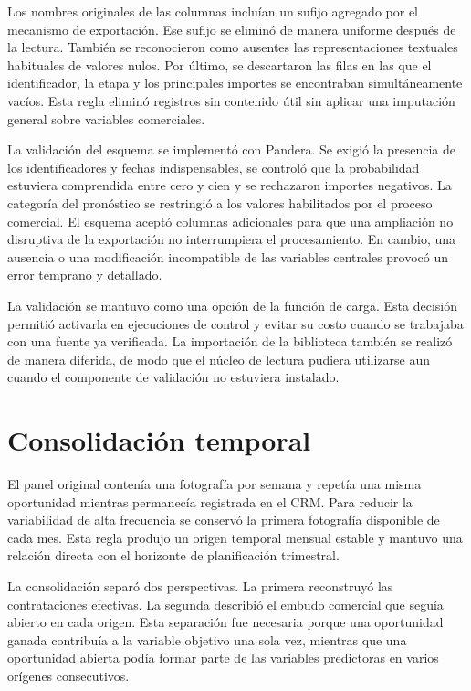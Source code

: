 Los nombres originales de las columnas incluían un sufijo agregado por el mecanismo de exportación. Ese sufijo se eliminó de manera uniforme después de la lectura. También se reconocieron como ausentes las representaciones textuales habituales de valores nulos. Por último, se descartaron las filas en las que el identificador, la etapa y los principales importes se encontraban simultáneamente vacíos. Esta regla eliminó registros sin contenido útil sin aplicar una imputación general sobre variables comerciales.

La validación del esquema se implementó con Pandera. Se exigió la presencia de los identificadores y fechas indispensables, se controló que la probabilidad estuviera comprendida entre cero y cien y se rechazaron importes negativos. La categoría del pronóstico se restringió a los valores habilitados por el proceso comercial. El esquema aceptó columnas adicionales para que una ampliación no disruptiva de la exportación no interrumpiera el procesamiento. En cambio, una ausencia o una modificación incompatible de las variables centrales provocó un error temprano y detallado.

La validación se mantuvo como una opción de la función de carga. Esta decisión permitió activarla en ejecuciones de control y evitar su costo cuando se trabajaba con una fuente ya verificada. La importación de la biblioteca también se realizó de manera diferida, de modo que el núcleo de lectura pudiera utilizarse aun cuando el componente de validación no estuviera instalado.

\section{Consolidación temporal}
\label{sec:consolidacionTemporal}

El panel original contenía una fotografía por semana y repetía una misma oportunidad mientras permanecía registrada en el CRM. Para reducir la variabilidad de alta frecuencia se conservó la primera fotografía disponible de cada mes. Esta regla produjo un origen temporal mensual estable y mantuvo una relación directa con el horizonte de planificación trimestral.

La consolidación separó dos perspectivas. La primera reconstruyó las contrataciones efectivas. La segunda describió el embudo comercial que seguía abierto en cada origen. Esta separación fue necesaria porque una oportunidad ganada contribuía a la variable objetivo una sola vez, mientras que una oportunidad abierta podía formar parte de las variables predictoras en varios orígenes consecutivos.

